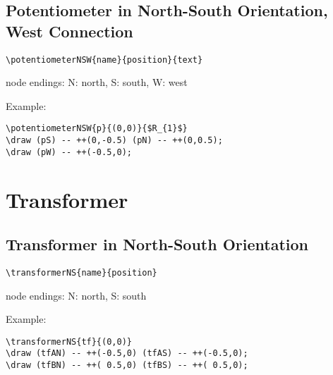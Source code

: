 \documentclass[parskip=full]{scrartcl}
\begin{document}
\subsection{Potentiometer in North-South Orientation, West Connection}

\begin{verbatim}
\potentiometerNSW{name}{position}{text}
\end{verbatim}
node endings: N: north, S: south, W: west

Example:\\
\begin{minipage}{0.8\textwidth}
\begin{verbatim}
\potentiometerNSW{p}{(0,0)}{$R_{1}$}
\draw (pS) -- ++(0,-0.5) (pN) -- ++(0,0.5);
\draw (pW) -- ++(-0.5,0);
\end{verbatim}
\end{minipage}
\begin{minipage}{0.19\textwidth}
\end{minipage}

\section{Transformer}

\subsection{Transformer in North-South Orientation}

\begin{verbatim}
\transformerNS{name}{position}
\end{verbatim}
node endings: N: north, S: south

Example:\\
\begin{minipage}{0.8\textwidth}
\begin{verbatim}
\transformerNS{tf}{(0,0)}
\draw (tfAN) -- ++(-0.5,0) (tfAS) -- ++(-0.5,0);
\draw (tfBN) -- ++( 0.5,0) (tfBS) -- ++( 0.5,0);
\end{verbatim}
\end{minipage}
\begin{minipage}{0.19\textwidth}
\end{minipage}
\end{document}
